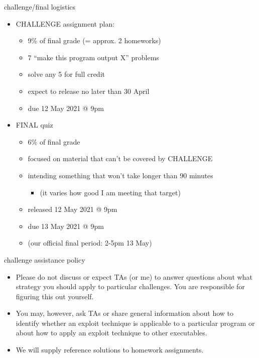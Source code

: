 \begin{frame}{challenge/final logistics}
    \begin{itemize}
    \item CHALLENGE assignment plan:
        \begin{itemize}
        \item 9\% of final grade (= approx. 2 homeworks)
        \item 7 ``make this program output X'' problems
        \item solve any 5 for full credit
        \item expect to release no later than 30 April
        \item due 12 May 2021 @ 9pm
        \end{itemize}
    \item FINAL quiz
        \begin{itemize}
        \item 6\% of final grade
        \item focused on material that can't be covered by CHALLENGE
        \item intending something that won't take longer than 90 minutes 
            \begin{itemize}
            \item (it varies how good I am meeting that target)
            \end{itemize}
        \item released 12 May 2021 @ 9pm
        \item due 13 May 2021 @ 9pm
        \item (our official final period: 2-5pm 13 May)
        \end{itemize}
    \end{itemize}
\end{frame}

\begin{frame}{challenge assistance policy}
    \begin{itemize}
    \item Please do not discuss or expect TAs (or me) to answer questions about what strategy you should apply to particular challenges. You are responsible for figuring this out yourself.
    \item You may, however, ask TAs or share general information about how to identify whether an exploit technique is applicable to a particular program or about how to apply an exploit technique to other executables.
    \vspace{.5cm}
    \item We will supply reference solutions to homework assignments.
    \end{itemize}
\end{frame}

